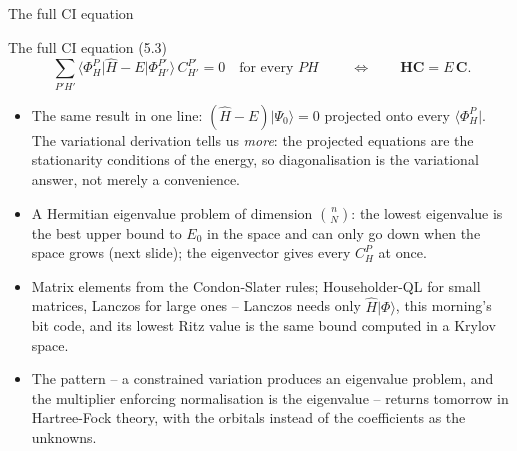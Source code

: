 \documentclass[aspectratio=169,10pt]{beamer}
\newcommand{\ket}[1]{\vert #1\rangle}
\newcommand{\bra}[1]{\langle #1\vert}
\begin{document}
\begin{frame}{The full CI equation}
  \footnotesize
  \begin{block}{The full CI equation (5.3)}
    \[
      \boxed{\;\sum_{P'H'}\bra{\Phi_H^P}\hat{H}-E\ket{\Phi_{H'}^{P'}}\,C_{H'}^{P'}=0\quad\text{for every }PH\;}
      \qquad\Longleftrightarrow\qquad
      \bm{H}\bm{C}=E\,\bm{C}.
    \]
  \end{block}
  \begin{itemize}
    \item The same result in one line: $(\hat{H}-E)\ket{\Psi_0}=0$ projected onto every $\bra{\Phi_H^P}$. The variational derivation tells us \emph{more}: the projected equations are the stationarity conditions of the energy, so diagonalisation is the \alert{variational answer}, not merely a convenience.
    \item A Hermitian eigenvalue problem of dimension $\binom{n}{N}$: the lowest eigenvalue is the best upper bound to $E_0$ in the space and can only go down when the space grows (next slide); the eigenvector gives every $C_H^P$ at once.
    \item Matrix elements from the Condon-Slater rules; Householder-QL for small matrices, Lanczos for large ones -- Lanczos needs only $\hat{H}\ket{\Phi}$, this morning's bit code, and its lowest Ritz value is the same bound computed in a Krylov space.
    \item The pattern -- a constrained variation produces an eigenvalue problem, and the multiplier enforcing normalisation is the eigenvalue -- returns tomorrow in Hartree-Fock theory, with the orbitals instead of the coefficients as the unknowns.
  \end{itemize}
\end{frame}
\end{document}
